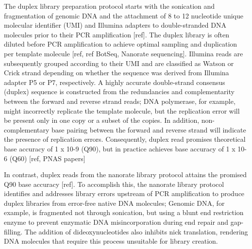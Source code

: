 The duplex library preparation protocol starts with the sonication and fragmentation of genomic DNA and the attachment of 8 to 12 nucleotide unique molecular identifier (UMI) and Illumina adapters to double-stranded DNA molecules prior to their PCR amplification [ref]. The duplex library is often diluted before PCR amplification to achieve optimal sampling and duplication per template molecule [ref, ref BotSeq, Nanorate sequencing]. Illumina reads are subsequently grouped according to their UMI and are classified as Watson or Crick strand depending on whether the sequence was derived from Illumina adapter P5 or P7, respectively. A highly accurate double-strand consensus (duplex) sequence is constructed from the redundancies and complementarity between the forward and reverse strand reads; DNA polymerase, for example, might incorrectly replicate the template molecule, but the replication error will be present only in one copy or a subset of the copies. In addition, non-complementary base pairing between the forward and reverse strand will indicate the presence of replication errors. Consequently, duplex read promises theoretical base accuracy of 1 x 10-9 (Q90), but in practice achieves base accuracy of 1 x 10-6 (Q60) [ref, PNAS papers]

In contrast, duplex reads from the nanorate library protocol attains the promised Q90 base accuracy [ref]. To accomplish this, the nanorate library protocol identifies and addresses library errors upstream of PCR amplification to produce duplex libraries from error-free native DNA molecules; Genomic DNA, for example, is fragmented not through sonication, but using a blunt end restriction enzyme to prevent enzymatic DNA misincorporation during end repair and gap-filling. The addition of dideoxynucleotides also inhibits nick translation, rendering DNA molecules that require this process unsuitable for library creation. 

